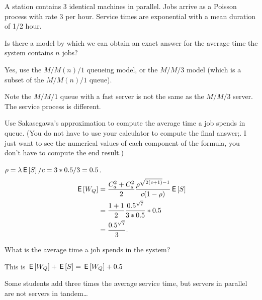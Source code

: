 A station contains 3 identical machines in parallel. Jobs arrive as a Poisson process with rate $3$ per hour. Service times are exponential with a mean duration of 1/2 hour. 

\begin{exercise}[201807]\label{ex:92}
 Is there a model by which we can obtain an exact answer for the average time the system contains $n$ jobs? 
\begin{solution}
 Yes, use the $M/M(n)/1$ queueing model, or the $M/M/3$ model (which is a subset of the $M/M(n)/1$ queue). 

Note the $M/M/1$ queue with a fast server is not the same as the $M/M/3$ server. The service process is different. 
\end{solution}
\end{exercise}


\begin{exercise}[201807]
Use Sakasegawa's approximation to compute the average time a job spends in queue. (You do not have to use your calculator to compute the final answer;. I just want to see the numerical values of each component of the formula, you don't have to compute the end result.)
\begin{solution}
$\rho = \lambda \,\mathsf{E}\left[S\right]/c = 3 *0.5/3=0.5$.
\begin{align*}
 \,\mathsf{E}\left[W_Q\right] 
&= \frac{C_a^2+C_s^2}2 \frac{\rho^{\sqrt{2(c+1)}-1}}{c(1-\rho)} \,\mathsf{E}\left[S\right] \\
&= \frac{1+1}2 \frac{0.5^{\sqrt{7}}}{3*0.5} *0.5 \\
&=\frac{0.5^{\sqrt{7}}}{3}. 
\end{align*}
\end{solution}
\end{exercise}


\begin{exercise}[201807]
 What is the average time a job spends in the system?
\begin{solution}
 This is $\,\mathsf{E}\left[W_Q\right] + \,\mathsf{E}\left[S\right] = \,\mathsf{E}\left[W_Q\right] + 0.5$
\end{solution}

Some students add three times the average service time, but servers in parallel are not servers in tandem\ldots
\end{exercise}


